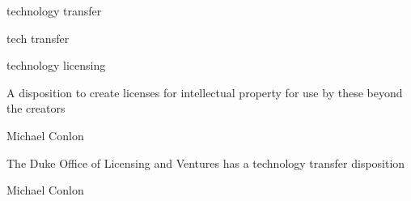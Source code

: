 \documentclass[letterpaper,10pt,english]{sphinxmanual}
\begin{document}
\begin{sphinxShadowBox}

\sphinxAtStartPar
technology transfer
\end{sphinxShadowBox}

\begin{sphinxShadowBox}

\sphinxAtStartPar
tech transfer

\sphinxAtStartPar
technology licensing
\end{sphinxShadowBox}

\begin{sphinxShadowBox}

\sphinxAtStartPar
{\hyperref[\detokenize{doc-BFO_0000016::doc}]{}}
\end{sphinxShadowBox}

\begin{sphinxShadowBox}

\sphinxAtStartPar
A disposition to create licenses for intellectual property for use by these beyond the creators
\end{sphinxShadowBox}

\begin{sphinxShadowBox}

\sphinxAtStartPar
Michael Conlon 
\end{sphinxShadowBox}

\begin{sphinxShadowBox}

\sphinxAtStartPar
The Duke Office of Licensing and Ventures has a technology transfer disposition
\end{sphinxShadowBox}

\begin{sphinxShadowBox}

\sphinxAtStartPar
{}
\end{sphinxShadowBox}

\begin{sphinxShadowBox}

\sphinxAtStartPar
Michael Conlon 
\end{sphinxShadowBox}
\begin{quote}

\ignorespaces \end{quote}
\end{document}
